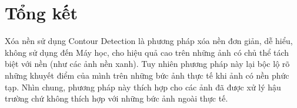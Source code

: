 \documentclass[conference]{IEEEtran}
\begin{document}
 \section{Tổng kết}
 Xóa nền sử dụng Contour Detection là phương pháp xóa nền đơn giản, dễ hiểu, không sử dụng đến Máy học, cho hiệu quả cao trên những ảnh có chủ thể tách biệt với nền (như các ảnh nền xanh). Tuy nhiên phương pháp này lại bộc lộ rõ những khuyết điểm của mình trên những bức ảnh thực tế khi ảnh có nền phức tạp. Nhìn chung, phương pháp này thích hợp cho các ảnh đã được xử lý hậu trường chứ không thích hợp với những bức ảnh ngoài thực tế. 
\begin{thebibliography}{00}
 \url{https://en.wikipedia.org/wiki/Foreground\_detection}}
\bibitem{b2} \url{https://machinelearningknowledge.ai/image-segmentation-in-python-opencv/#ii\_Contour\_Detection}
\bibitem{b3} \url{https://bleedai.com/contour-detection-101-the-basics-pt1/}
\bibitem{b4} \url{https://learnopencv.com/contour-detection-using-opencv-python-c/}
\bibitem{b5} \url{https://docs.opencv.org/4.x/d3/db4/tutorial\_py\_watershed.html}
\bibitem{b6} \url{https://docs.opencv.org/3.4/d4/d73/tutorial\_py\_contours_begin.html}

\end{thebibliography}
\end{document}
